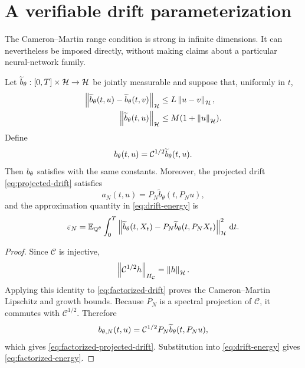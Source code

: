 \section{A verifiable drift parameterization}
\label{sec:appendix-architectures}

The Cameron--Martin range condition is strong in infinite dimensions.
It can nevertheless be imposed directly, without making claims about
a particular neural-network family.

\begin{proposition}
\label{prop:factorized-drift}
Let
$\widetilde b_\theta:[0,T]\times\mathcal{H}\to\mathcal{H}$ be jointly measurable and
suppose that, uniformly in $t$,
\begin{align}
  \left\lVert\widetilde b_\theta(t,u)
        -\widetilde b_\theta(t,v)\right\rVert_{\mathcal{H}}
    &\leq L\left\lVert u-v\right\rVert_{\mathcal{H}},\\
  \left\lVert\widetilde b_\theta(t,u)\right\rVert_{\mathcal{H}}
    &\leq M(1+\left\lVert u\right\rVert_{\mathcal{H}}).
\end{align}
Define
\begin{equation}
  {b_{\theta}}(t,u)=\mathcal C^{1/2}\widetilde b_\theta(t,u).
  \label{eq:factorized-drift}
\end{equation}
Then ${b_{\theta}}$ satisfies  with the same constants.
Moreover, the projected drift \eqref{eq:projected-drift} satisfies
\begin{equation}
  a_N(t,u)
  =P_N\widetilde b_\theta(t,P_Nu),
  \label{eq:factorized-projected-drift}
\end{equation}
and the approximation quantity in \eqref{eq:drift-energy} is
\begin{equation}
  \varepsilon_N
  =
  \mathbb E_{\mathbb Q^\theta}
  \int_0^T
  \left\lVert
    \widetilde b_\theta(t,X_t)
    -P_N\widetilde b_\theta(t,P_NX_t)
  \right\rVert_{\mathcal{H}}^2\,\mathrm dt .
  \label{eq:factorized-energy}
\end{equation}
\end{proposition}

\begin{proof}
Since $\mathcal C$ is injective,
\[
  \left\lVert\mathcal C^{1/2}h\right\rVert_{H_{\mathcal C}}
  =\left\lVert h\right\rVert_{\mathcal{H}}.
\]
Applying this identity to \eqref{eq:factorized-drift} proves the
Cameron--Martin Lipschitz and growth bounds.  Because $P_N$ is a
spectral projection of $\mathcal C$, it commutes with
$\mathcal C^{1/2}$.  Therefore
\[
  {b_{\theta,N}}(t,u)
  =\mathcal C^{1/2}P_N
     \widetilde b_\theta(t,P_Nu),
\]
which gives \eqref{eq:factorized-projected-drift}.  Substitution into
\eqref{eq:drift-energy} gives \eqref{eq:factorized-energy}.
\end{proof}

